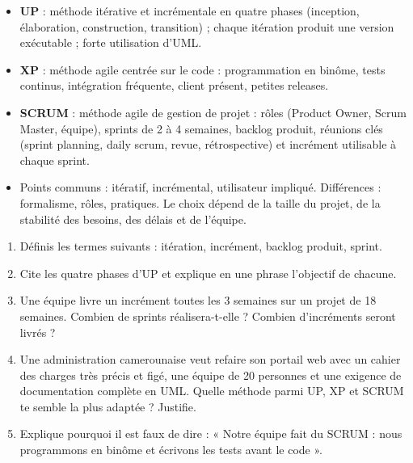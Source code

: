 \documentclass[11pt]{article}
\begin{document}
\begin{aretenir}
\begin{itemize}
  \item \textbf{UP} : méthode itérative et incrémentale en quatre phases (inception, élaboration, construction, transition) ; chaque itération produit une version exécutable ; forte utilisation d'UML.
  \item \textbf{XP} : méthode agile centrée sur le code : programmation en binôme, tests continus, intégration fréquente, client présent, petites releases.
  \item \textbf{SCRUM} : méthode agile de gestion de projet : rôles (Product Owner, Scrum Master, équipe), sprints de 2 à 4 semaines, backlog produit, réunions clés (sprint planning, daily scrum, revue, rétrospective) et incrément utilisable à chaque sprint.
  \item Points communs : itératif, incrémental, utilisateur impliqué. Différences : formalisme, rôles, pratiques. Le choix dépend de la taille du projet, de la stabilité des besoins, des délais et de l'équipe.
\end{itemize}
\end{aretenir}

\begin{exercice}
\begin{enumerate}
  \item Définis les termes suivants : itération, incrément, backlog produit, sprint.
  \item Cite les quatre phases d'UP et explique en une phrase l'objectif de chacune.
  \item Une équipe livre un incrément toutes les 3 semaines sur un projet de 18 semaines. Combien de sprints réalisera-t-elle ? Combien d'incréments seront livrés ?
  \item Une administration camerounaise veut refaire son portail web avec un cahier des charges très précis et figé, une équipe de 20 personnes et une exigence de documentation complète en UML. Quelle méthode parmi UP, XP et SCRUM te semble la plus adaptée ? Justifie.
  \item Explique pourquoi il est faux de dire : « Notre équipe fait du SCRUM : nous programmons en binôme et écrivons les tests avant le code ».
\end{enumerate}
\end{exercice}
\end{document}
